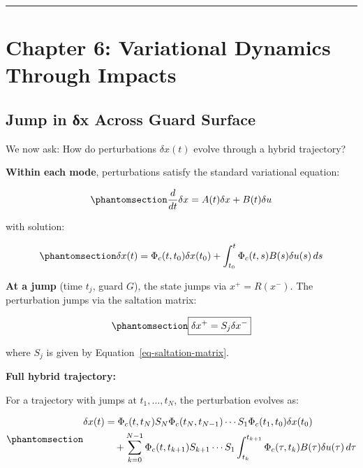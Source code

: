 \documentclass[
  letterpaper,
  DIV=11,
  numbers=noendperiod]{scrartcl}
\begin{document}
\begin{center}\rule{0.5\linewidth}{0.5pt}\end{center}

\section{Chapter 6: Variational Dynamics Through
Impacts}\label{sec-variation-through-jumps}

\subsection{Jump in δx Across Guard
Surface}\label{jump-in-ux3b4x-across-guard-surface}

We now ask: How do perturbations \(\delta x(t)\) evolve through a hybrid
trajectory?

\textbf{Within each mode}, perturbations satisfy the standard
variational equation:

\begin{equation}\phantomsection\label{eq-variational-smooth}{
\frac{d}{dt}\delta x = A(t) \delta x + B(t) \delta u
}\end{equation}

with solution:

\begin{equation}\phantomsection\label{eq-variation-smooth-integral}{
\delta x(t) = \Phi_c(t, t_0) \delta x(t_0) + \int_{t_0}^t \Phi_c(t, s) B(s) \delta u(s) \, ds
}\end{equation}

\textbf{At a jump} (time \(t_j\), guard \(G\)), the state jumps via
\(x^+ = R(x^-)\). The perturbation jumps via the saltation matrix:

\begin{equation}\phantomsection\label{eq-variation-jump}{
\boxed{\delta x^+ = S_j \delta x^-}
}\end{equation}

where \(S_j\) is given by Equation~\ref{eq-saltation-matrix}.

\textbf{Full hybrid trajectory:}

For a trajectory with jumps at \(t_1, \ldots, t_N\), the perturbation
evolves as:

\begin{equation}\phantomsection\label{eq-variation-hybrid-full}{
\begin{aligned}
\delta x(t) &= \Phi_c(t, t_N) S_N \Phi_c(t_N, t_{N-1}) \cdots S_1 \Phi_c(t_1, t_0) \delta x(t_0) \\
&\quad + \sum_{k=0}^{N-1} \Phi_c(t, t_{k+1}) S_{k+1} \cdots S_1 \int_{t_k}^{t_{k+1}} \Phi_c(\tau, t_k) B(\tau) \delta u(\tau) \, d\tau
\end{aligned}
}\end{equation}
\end{document}
